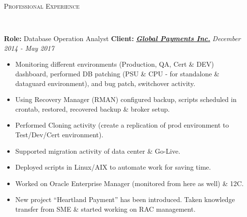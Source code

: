 \documentclass[9pt]{article}
\newenvironment{changemargin}[2]{%
  \begin{list}{}{%
    \setlength{\topsep}{0pt}%
    \setlength{\leftmargin}{#1}%
    \setlength{\rightmargin}{#2}%
    \setlength{\listparindent}{\parindent}%
    \setlength{\itemindent}{\parindent}%
    \setlength{\parsep}{\parskip}%
  }%
  \item[]}{\end{list}
}
\newcommand{\lineover}{
	\begin{changemargin}{-0.05in}{-0.05in}
		\vspace*{-8pt}
		\hrulefill \\
		\vspace*{-2pt}
	\end{changemargin}
}
\newcommand{\header}[1]{
	\begin{changemargin}{-0.5in}{-0.5in}
		\scshape{#1}\\
  	\lineover
	\end{changemargin}
}
\newenvironment{body} {
	\vspace*{-16pt}
	\begin{changemargin}{-0.25in}{-0.5in}
  }
	{\end{changemargin}
}
\begin{document}
\header{Professional Experience}
\begin{body}
	\vspace{14pt}
        \textbf{Role:} Database Operation Analyst \textbf{Client:} \textbf{\emph{\href{https://www.globalpaymentsinc.com/en-us}{Global Payments Inc.}}} \hfill \emph{December 2014 - May 2017}\\
	\vspace*{-4pt}
	\begin{itemize} \itemsep -0pt
          \item Monitoring different environments (Production, QA, Cert \& DEV) dashboard,
performed DB patching (PSU \& CPU - for standalone \& dataguard environment), and
bug patch, switchover activity.
          \item Using Recovery Manager (RMAN) configured backup, scripts scheduled in crontab,
restored, recovered backup \& broker setup.
          \item Performed Cloning activity (create a replication of prod environment to Test/Dev/Cert
environment).
          \item Supported migration activity of data center \& Go-Live.
          \item Deployed scripts in Linux/AIX to automate work for saving time.
          \item Worked on Oracle Enterprise Manager (monitored from here as well) \& 12C.
          \item New project “Heartland Payment” has been introduced. Taken knowledge transfer
from SME \& started working on RAC management.
	\end{itemize}

	\vspace*{-4pt}


\end{body}
\end{document}
